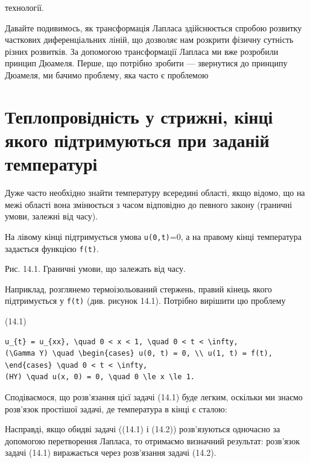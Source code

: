 \documentclass[
  ukrainian,
]{article}
\begin{document}
технології.

Давайте подивимось, як трансформація Лапласа здійснюється спробою
розвитку часткових диференціальних ліній, що дозволяє нам розкрити
фізичну сутність різних розвитків. За допомогою трансформації Лапласа ми
вже розробили принцип Дюамеля. Перше, що потрібно зробити --- звернутися
до принципу Дюамеля, ми бачимо проблему, яка часто є проблемою

\section{Теплопровідність у стрижні, кінці якого підтримуються при
заданій
температурі}\label{ux442ux435ux43fux43bux43eux43fux440ux43eux432ux456ux434ux43dux456ux441ux442ux44c-ux443-ux441ux442ux440ux438ux436ux43dux456-ux43aux456ux43dux446ux456-ux44fux43aux43eux433ux43e-ux43fux456ux434ux442ux440ux438ux43cux443ux44eux442ux44cux441ux44f-ux43fux440ux438-ux437ux430ux434ux430ux43dux456ux439-ux442ux435ux43cux43fux435ux440ux430ux442ux443ux440ux456}

Дуже часто необхідно знайти температуру всередині області, якщо відомо,
що на межі області вона змінюється з часом відповідно до певного закону
(граничні умови, залежні від часу).

На лівому кінці підтримується умова \texttt{u(0,t)}=0, а на правому
кінці температура задається функцією \texttt{f(t)}.

Рис. 14.1. Граничні умови, що залежать від часу.

Наприклад, розглянемо термоізольований стержень, правий кінець якого
підтримується у \texttt{f(t)} (див. рисунок 14.1). Потрібно вирішити цю
проблему

(14.1)

\begin{verbatim}
u_{t} = u_{xx}, \quad 0 < x < 1, \quad 0 < t < \infty,
(\Gamma Y) \quad \begin{cases} u(0, t) = 0, \\ u(1, t) = f(t), \end{cases} \quad 0 < t < \infty,
(HY) \quad u(x, 0) = 0, \quad 0 \le x \le 1.
\end{verbatim}

Сподіваємося, що розв'язання цієї задачі (14.1) буде легким, оскільки ми
знаємо розв'язок простішої задачі, де температура в кінці є сталою:

Насправді, якщо обидві задачі ((14.1) і (14.2)) розв'язуються одночасно
за допомогою перетворення Лапласа, то отримаємо визначний результат:
розв'язок задачі (14.1) виражається через розв'язання задачі (14.2).
\end{document}
